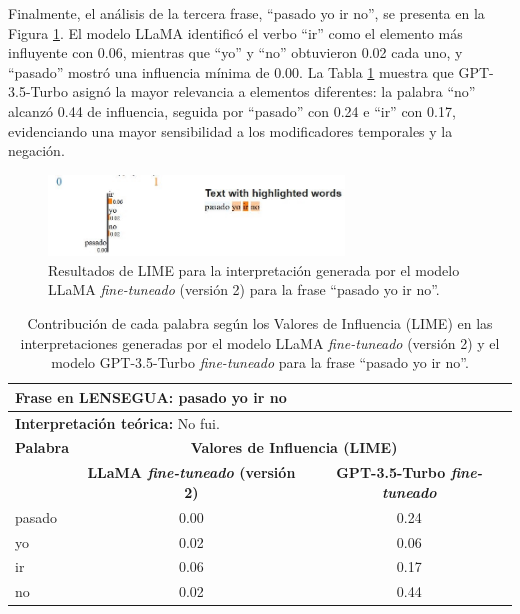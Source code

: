 Finalmente, el análisis de la tercera frase, “pasado yo ir no”, se presenta en la Figura \ref{fig:LIME2-F3}. El modelo LLaMA identificó el verbo “ir” como el elemento más influyente con 0.06, mientras que “yo” y “no” obtuvieron 0.02 cada uno, y “pasado” mostró una influencia mínima de 0.00. La Tabla \ref{tab:LIME2-3} muestra que GPT-3.5-Turbo asignó la mayor relevancia a elementos diferentes: la palabra “no” alcanzó 0.44 de influencia, seguida por “pasado” con 0.24 e “ir” con 0.17, evidenciando una mayor sensibilidad a los modificadores temporales y la negación.

\begin{figure}[H]
\centering
    \includegraphics[width=0.7\textwidth]{figuras/Oracion3.JPG}
    \caption{Resultados de LIME para la interpretación generada por el modelo LLaMA \textit{fine-tuneado} (versión 2) para la frase “pasado yo ir no”.}
    \label{fig:LIME2-F3}
\end{figure}

\vspace{0.5cm}
\begin{table}[H]
\centering
    \begin{tabular}{|l|c|c|}
        \hline
        \multicolumn{3}{|l|}{\textbf{Frase en LENSEGUA:} pasado yo ir no} \\ \hline
        \multicolumn{3}{|l|}{\textbf{Interpretación teórica:} No fui.} \\ \hline \hline
        
        \textbf{Palabra} & \multicolumn{2}{c|}{\textbf{Valores de Influencia (LIME)}} \\ 
        \cline{2-3}
        & \textbf{LLaMA \textit{fine-tuneado} (versión 2)} & \textbf{GPT-3.5-Turbo \textit{fine-tuneado}} \\
         
        \hline
        pasado & 0.00 & 0.24 \\
        \hline
        yo & 0.02 & 0.06 \\
        \hline
        ir & 0.06  & 0.17 \\
        \hline
        no & 0.02  & 0.44 \\
        \hline

    \end{tabular}
\caption{Contribución de cada palabra según los Valores de Influencia (LIME) en las interpretaciones generadas por el modelo LLaMA \textit{fine-tuneado} (versión 2) y el modelo GPT-3.5-Turbo \textit{fine-tuneado} para la frase “pasado yo ir no”.}
\label{tab:LIME2-3}
\end{table}

